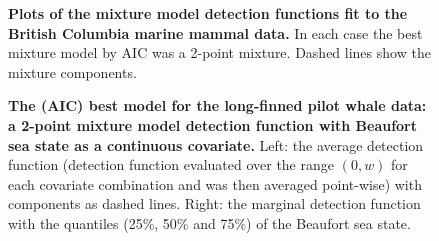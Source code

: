 \documentclass[10pt]{article}
\begin{document}
\begin{figure}[!ht]
\centering
\caption{
{\bf Plots of the mixture model detection functions fit to the British Columbia marine mammal data.} In each case the best mixture model by AIC was a 2-point mixture. Dashed lines show the mixture components.
}
\label{williams-detfcts}
\end{figure}

\begin{figure}[!ht]
\centering
\caption{
{\bf The (AIC) best model for the long-finned pilot whale data: a 2-point mixture model detection function with Beaufort sea state as a continuous covariate.} Left: the average detection function (detection function evaluated over the range $(0,w)$ for each covariate combination and was then averaged point-wise) with components as dashed lines. Right: the marginal detection function with the quantiles (25\%, 50\% and 75\%) of the Beaufort sea state.
}
\label{danpike-detfct}
\end{figure}
\end{document}
